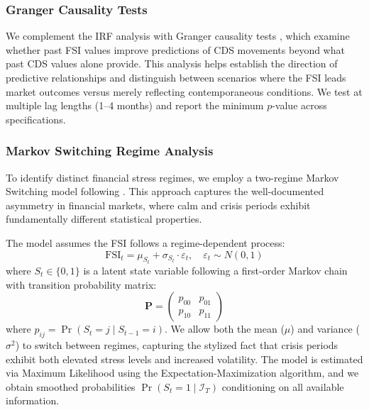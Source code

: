 \subsubsection{Granger Causality Tests}

We complement the IRF analysis with Granger causality tests \citep{granger1969investigating}, which examine whether past FSI values improve predictions of CDS movements beyond what past CDS values alone provide. This analysis helps establish the direction of predictive relationships and distinguish between scenarios where the FSI leads market outcomes versus merely reflecting contemporaneous conditions. We test at multiple lag lengths (1--4 months) and report the minimum $p$-value across specifications.

\subsubsection{Markov Switching Regime Analysis}

To identify distinct financial stress regimes, we employ a two-regime Markov Switching model following \cite{hamilton1989new}. This approach captures the well-documented asymmetry in financial markets, where calm and crisis periods exhibit fundamentally different statistical properties.

The model assumes the FSI follows a regime-dependent process:
\begin{equation}\label{eq:markov}
    \text{FSI}_t = \mu_{S_t} + \sigma_{S_t} \cdot \varepsilon_t, \quad \varepsilon_t \sim N(0,1)
\end{equation}
where $S_t \in \{0, 1\}$ is a latent state variable following a first-order Markov chain with transition probability matrix:
\begin{equation}\label{eq:transition}
    \mathbf{P} = \begin{pmatrix} p_{00} & p_{01} \\ p_{10} & p_{11} \end{pmatrix}
\end{equation}
where $p_{ij} = \Pr(S_t = j \mid S_{t-1} = i)$. We allow both the mean ($\mu$) and variance ($\sigma^2$) to switch between regimes, capturing the stylized fact that crisis periods exhibit both elevated stress levels and increased volatility. The model is estimated via Maximum Likelihood using the Expectation-Maximization algorithm, and we obtain smoothed probabilities $\Pr(S_t = 1 \mid \mathcal{I}_T)$ conditioning on all available information.

